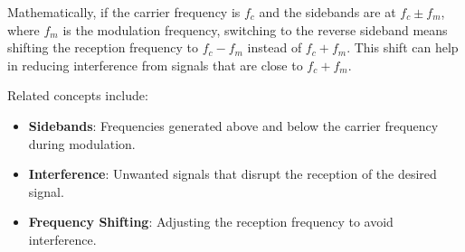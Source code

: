 Mathematically, if the carrier frequency is \( f_c \) and the sidebands are at \( f_c \pm f_m \), where \( f_m \) is the modulation frequency, switching to the reverse sideband means shifting the reception frequency to \( f_c - f_m \) instead of \( f_c + f_m \). This shift can help in reducing interference from signals that are close to \( f_c + f_m \).

Related concepts include:
\begin{itemize}
    \item \textbf{Sidebands}: Frequencies generated above and below the carrier frequency during modulation.
    \item \textbf{Interference}: Unwanted signals that disrupt the reception of the desired signal.
    \item \textbf{Frequency Shifting}: Adjusting the reception frequency to avoid interference.
\end{itemize}

